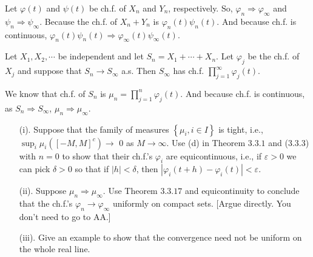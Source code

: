 \documentclass[en, normal, 12pt, black]{elegantnote}
\newenvironment{exercise}[1]{\begin{tcolorbox}[colback=black!15, colframe=black!80, breakable, title=#1]}{\end{tcolorbox}}
\newenvironment{solution}{\begin{tcolorbox}[colback=white, colframe=black!50, breakable, title=Solution. ]\setlength{\parskip}{0.8em}}{\end{tcolorbox}}
\begin{document}
\begin{solution}
    Let $\varphi(t)$ and $\psi(t)$ be ch.f. of $X_n$ and $Y_n$, respectively. So, $\varphi_n\Rightarrow \varphi_\infty$ and $\psi_n\Rightarrow\psi_\infty$. Because the ch.f. of $X_n+Y_n$ is $\varphi_n(t)\psi_n(t)$. And because ch.f. is continuous, $\varphi_n(t)\psi_n(t)\Rightarrow\varphi_\infty(t)\psi_\infty(t)$. 
\end{solution}

\begin{exercise}{3.3.9}
    Let $X_{1}, X_{2}, \cdots$ be independent and let $S_{n}=X_{1}+\cdots+X_{n}$. Let $\varphi_{j}$ be the ch.f. of $X_{j}$ and suppose that $S_{n} \rightarrow S_{\infty}$ a.s. Then $S_{\infty}$ has ch.f. $\prod_{j=1}^{\infty} \varphi_{j}(t)$. 
\end{exercise}

\begin{solution}
    We know that ch.f. of $S_n$ is $\mu_n=\prod_{j=1}^n\varphi_j(t)$. And because ch.f. is continuous, as $S_n\Rightarrow S_\infty$, $\mu_n\Rightarrow\mu_\infty$. 
\end{solution}



\begin{exercise}{3.3.13}
        \begin{itemize}
            \item[(i).] Suppose that the family of measures $\left\{\mu_{i}, i \in I\right\}$ is tight, i.e., $\sup _{i} \mu_{i}\left([-M, M]^{c}\right) \rightarrow$ 0 as $M \rightarrow \infty$. Use (d) in Theorem $3.3 .1$ and (3.3.3) with $n=0$ to show that their ch.f.'s $\varphi_{i}$ are equicontinuous, i.e., if $\varepsilon>0$ we can pick $\delta>0$ so that if $|h|<\delta$, then $\left|\varphi_{i}(t+h)-\varphi_{i}(t)\right|<\varepsilon$. 
            \item[(ii).] Suppose $\mu_{n} \Rightarrow \mu_{\infty}$. Use Theorem $3.3.17$ and equicontinuity to conclude that the ch.f.'s $\varphi_{n} \rightarrow \varphi_{\infty}$ uniformly on compact sets. [Argue directly. You don't need to go to AA.] 
            \item[(iii).] Give an example to show that the convergence need not be uniform on the whole real line.
        \end{itemize}
\end{exercise}
\end{document}
